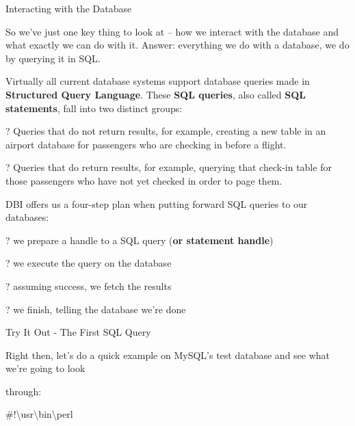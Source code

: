 \documentclass[a4paper,11pt]{book}
\begin{document}
\noindent 

\noindent Interacting with the Database

\noindent 

\noindent So we've just one key thing to look at -- how we interact with the database and what exactly we can do with it. Answer: everything we do with a database, we do by querying it in SQL.

\noindent 

\noindent Virtually all current database systems support database queries made in \textbf{Structured Query Language}. These \textbf{SQL queries}, also called \textbf{SQL statements}, fall into two distinct groups:

\noindent 

\noindent ? Queries that do not return results, for example, creating a new table in an airport database for passengers who are checking in before a flight.

\noindent 

\noindent ? Queries that do return results, for example, querying that check-in table for those passengers who have not yet checked in order to page them.

\noindent 

\noindent DBI offers us a four-step plan when putting forward SQL queries to our databases:

\noindent 

\noindent ? we prepare a handle to a SQL query (\textbf{or statement handle})

\noindent 

\noindent ? we execute the query on the database

\noindent 

\noindent ? assuming success, we fetch the results

\noindent 

\noindent ? we finish, telling the database we're done

\noindent 

\noindent Try It Out - The First SQL Query

\noindent 

\noindent 

\noindent Right then, let's do a quick example on MySQL's test database and see what we're going to look

\noindent through:

\noindent 

\noindent 

\noindent \#!\textbackslash usr\textbackslash bin\textbackslash perl
\end{document}
